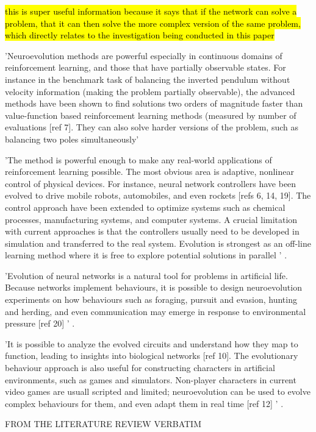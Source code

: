 \hl{this is super useful information because it says that if the network can solve a problem, that it can then solve the more complex version of the same problem, which directly relates to the investigation being conducted in this paper}

'Neuroevolution methods are powerful especially in continuous domains of reinforcement learning, and those that have partially observable states. For instance in the benchmark task of balancing the inverted pendulum without velocity information (making the problem partially observable), the advanced methods have been shown to find solutions two orders of magnitude faster than value-function based reinforcement learning methods (measured by number of evaluations [ref 7]. They can also solve harder versions of the problem, such as balancing two poles simultaneously'

'The method is powerful enough to make any real-world applications of reinforcement learning possible. The most obvious area is adaptive, nonlinear control of physical devices. For instance, neural network controllers have been evolved to drive mobile robots, automobiles, and even rockets [refs 6, 14, 19]. The control approach have been extended to optimize systems such as chemical processes, manufacturing systems, and computer systems. A crucial limitation with current approaches is that the controllers usually need to be developed in simulation and transferred to the real system. Evolution is strongest as an off-line learning method where it is free to explore potential solutions in parallel ' \cite{Miikkulainen2010}.

'Evolution of neural networks is a natural tool for problems in artificial life. Because networks implement behaviours, it is possible to design neuroevolution experiments on how behaviours such as foraging, pursuit and evasion, hunting and herding, and even communication may emerge in response to environmental pressure [ref 20] ' \cite{Miikkulainen2010}.

'It is possible to analyze the evolved circuits and understand how they map to function, leading to insights into biological networks [ref 10]. The evolutionary behaviour approach is also useful for constructing characters in artificial environments, such as games and simulators. Non-player characters in current video games are usuall scripted and limited; neuroevolution can be used to evolve complex behaviours for them, and even adapt them in real time [ref 12] ' \cite{Miikkulainen2010}.


FROM THE LITERATURE REVIEW VERBATIM


